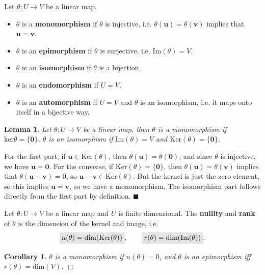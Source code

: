 \documentclass[letter-paper]{tufte-book}
\newtheorem{lemma}[theorem]{\color{pastel-blue}Lemma}
\newtheorem{corollary}[theorem]{\color{pastel-blue}Corollary}
\newenvironment{proof}[1][Proof]{\begin{trivlist}
\item[\hskip \labelsep {\bfseries #1}]}{\end{trivlist}}
\newcommand{\Ob}{{\boldsymbol{0}}}
\newcommand{\ub}{{\boldsymbol{u}}}
\newcommand{\qed}{\hfill$\blacksquare$}
\newcommand{\qedwhite}{\hfill \ensuremath{\Box}}
\newcommand{\highlight}[1]{\mathchoice%
  {\colorbox{black!10}{$\displaystyle#1$}}%
  {\colorbox{black!10}{$\textstyle#1$}}%
  {\colorbox{black!10}{$\scriptstyle#1$}}%
  {\colorbox{black!10}{$\scriptscriptstyle#1$}}}%
\begin{document}
Let $\theta : U \to V$ be a linear map.
\begin{itemize}
  \item $\theta$ is a \textbf{monomorphism} if $\theta$ is injective, i.e. $\theta(\ub) = \theta(\boldsymbol{v})$ implies that $\ub = \boldsymbol{v}$.
  \item $\theta$ is an \textbf{epimorphism} if $\theta$ is surjective, i.e. $\mbox{Im}(\theta) = V$.
  \item $\theta$ is an \textbf{isomorphism} if $\theta$ is a bijection.
  \item $\theta$ is an \textbf{endomorphism} if $U = V$.
  \item $\theta$ is an \textbf{automorphism} if $U=V$ and $\theta$ is an isomorphism, i.e. it maps onto itself in a bijective way.
\end{itemize}

\begin{lemma}
  Let $\theta : U \to V$ be a linear map, then $\theta$ is a monomorphism if $\mbox{ker}\theta = \{\Ob\}$. $\theta$ is an isomorphism if $\mbox{Im}(\theta) = V$ and $\mbox{Ker}(\theta) = \{\Ob\}$.
\end{lemma}

\begin{proof}
  For the first part, if $\ub \in \mbox{Ker}(\theta)$, then $\theta(\ub) = \theta(\Ob)$, and since $\theta$ is injective, we have $\ub = \Ob$. For the converse, if $\mbox{Ker}(\theta)=\{\Ob\}$, then $\theta(\ub) = \theta(\boldsymbol{v})$ implies that $\theta(\ub - \boldsymbol{v}) = 0$, so $\ub - \boldsymbol{v} \in \mbox{Ker}(\theta)$. But the kernel is just the zero element, so this implies $\ub = \boldsymbol{v}$, so we have a monomorphism. The isomorphism part follows directly from the first part by definition. \qed
\end{proof}

Let $\theta: U \to V$ be a linear map and $U$ is finite dimensional. The \textbf{nullity} and \textbf{rank} of $\theta$ is the dimension of the kernel and image, i.e.
\begin{equation}
  \highlight{n(\theta) = \mbox{dim}(\mbox{Ker}(\theta))}, \qquad \highlight{r(\theta) = \mbox{dim}(\mbox{Im}(\theta))}.
\end{equation}

\begin{corollary}
  $\theta$ is a monomorphism if $n(\theta) = 0$, and $\theta$ is an epimorphism iff $r(\theta) = \mbox{dim}(V)$. \qedwhite
\end{corollary}
\end{document}
